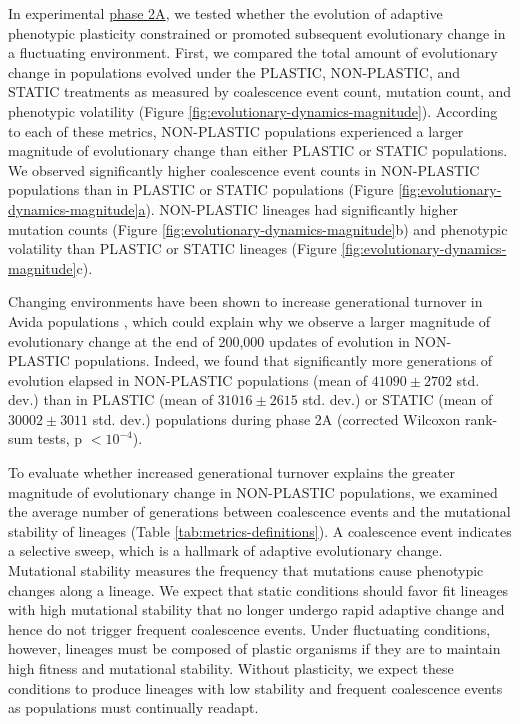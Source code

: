 In experimental \hyperref[sec:methods:exp:evolutionary-change-rate]{phase 2A},
we tested whether the evolution of adaptive phenotypic plasticity constrained or promoted subsequent evolutionary change in a fluctuating environment. 
First, we compared the total amount of evolutionary change in populations evolved under the PLASTIC, NON-PLASTIC, and STATIC treatments as measured by coalescence event count, mutation count, and phenotypic volatility (Figure \ref{fig:evolutionary-dynamics-magnitude}).
According to each of these metrics, NON-PLASTIC populations experienced a larger magnitude of evolutionary change than either PLASTIC or STATIC populations.
We observed significantly higher coalescence event counts in NON-PLASTIC populations than in PLASTIC or STATIC populations (Figure \ref{fig:evolutionary-dynamics-magnitude}\hyperref[fig:evolutionary-dynamics-magnitude]{a}).
NON-PLASTIC lineages had significantly higher mutation counts (Figure \ref{fig:evolutionary-dynamics-magnitude}b) and phenotypic volatility than PLASTIC or STATIC lineages (Figure \ref{fig:evolutionary-dynamics-magnitude}c).

Changing environments have been shown to increase generational turnover in Avida populations \citep{canino-koning_evolution_2016}, which could explain why we observe a larger magnitude of evolutionary change at the end of 200,000 updates of evolution in NON-PLASTIC populations. 
Indeed, we found that significantly more generations of evolution elapsed in NON-PLASTIC populations (mean of $41090\pm2702$ std. dev.) than in PLASTIC (mean of $31016\pm2615$ std. dev.) or STATIC (mean of $30002\pm3011$ std. dev.) populations during phase 2A (corrected Wilcoxon rank-sum tests, p $<10^{-4}$).

To evaluate whether increased generational turnover explains the greater magnitude of evolutionary change in NON-PLASTIC populations, we examined the average number of generations between coalescence events and the mutational stability of lineages (Table \ref{tab:metrics-definitions}).
A coalescence event indicates a selective sweep, which is a hallmark of adaptive evolutionary change.
Mutational stability measures the frequency that mutations cause phenotypic changes along a lineage.
We expect that static conditions should favor fit lineages with high mutational stability that no longer undergo rapid adaptive change and hence do not trigger frequent coalescence events.
Under fluctuating conditions, however, lineages must be composed of plastic organisms if they are to maintain high fitness and mutational stability.
Without plasticity, we expect these conditions to produce lineages with low stability and frequent coalescence events as populations must continually readapt.

